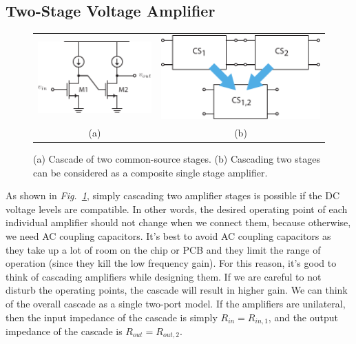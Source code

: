 \section{\topicB}
\subsection{Two-Stage Voltage Amplifier}
\begin{figure}[tb]
\centering
\begin{tabular}{cc}
\includegraphics[scale=1]{cs_cascade_sch} &
\includegraphics[width=.5\columnwidth]{1cascade}\\
(a) & (b)\\
\end{tabular}
\caption{(a) Cascade of two common-source stages.  (b) Cascading two stages can be considered as a composite single stage amplifier.}
\label{fig:1cascade}
\end{figure}
As shown in \emph{Fig.~\ref{fig:1cascade}}, simply cascading two amplifier stages is possible if the DC voltage levels are compatible. In other words, the desired operating point of each individual amplifier should not change when we connect them, because otherwise, we need AC coupling capacitors.  It's best to avoid AC coupling capacitors as they take up a lot of room on the chip or PCB and they limit the range of operation (since they kill the low frequency gain).  For this reason, it's good to think of cascading amplifiers while designing them.  If we are careful to not disturb the operating points, the cascade will result in higher gain.  We can think of the overall cascade as a single two-port model.  If the amplifiers are unilateral, then the input impedance of the cascade is simply  $R_{in} = R_{in,1}$, and the output impedance of the cascade is $R_{out} = R_{out,2}$.
